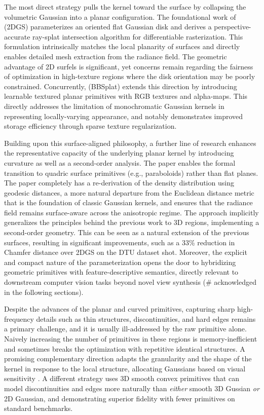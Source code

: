 \documentclass[11pt,a4paper]{article}
\begin{document}
The most direct strategy pulls the kernel toward the surface by collapsing the volumetric Gaussian into a planar configuration. The foundational work of \cite{arxiv:2403.17888v1} (2DGS) parameterizes an oriented flat Gaussian disk and derives a perspective-accurate ray-splat intersection algorithm for differentiable rasterization. This formulation intrinsically matches the local planarity of surfaces and directly enables detailed mesh extraction from the radiance field. The geometric advantage of 2D surfels is significant, yet concerns remain regarding the fairness of optimization in high-texture regions where the disk orientation may be poorly constrained. Concurrently, \cite{arxiv:2411.08508v4} (BBSplat) extends this direction by introducing learnable textured planar primitives with RGB textures and alpha-maps. This directly addresses the limitation of monochromatic Gaussian kernels in representing locally-varying appearance, and notably demonstrates improved storage efficiency through sparse texture regularization.

Building upon this surface-aligned philosophy, a further line of research enhances the representative capacity of the underlying planar kernel by introducing curvature as well as a second-order analysis. The \cite{arxiv:2411.16392v4} paper enables the formal transition to quadric surface primitives (e.g., paraboloids) rather than flat planes. The paper completely has a re-derivation of the density distribution using geodesic distances, a more natural departure from the Euclidean distance metric that is the foundation of classic Gaussian kernels, and ensures that the radiance field remains surface-aware across the anisotropic regime. The approach implicitly generalizes the principles behind the previous work to 3D regions, implementing a second-order geometry. This can be seen as a natural extension of the previous surfaces, resulting in significant improvements, such as a 33\% reduction in Chamfer distance over 2DGS on the DTU dataset shot. Moreover, the explicit and compact nature of the parameterization opens the door to hybridizing geometric primitives with feature-descriptive semantics, directly relevant to downstream computer vision tasks beyond novel view synthesis \cite{arxiv:2508.09977v5} (\# acknowledged in the following sections).

Despite the advances of the planar and curved primitives, capturing sharp high-frequency details such as thin structures, discontinuities, and hard edges remains a primary challenge, and it is usually ill-addressed by the raw primitive alone. Naively increasing the number of primitives in these regions is memory-inefficient and sometimes breaks the optimization with repetitive identical structures. A promising complementary direction adapts the granularity and the shape of the kernel in response to the local structure, allocating Gaussians based on visual sensitivity \cite{arxiv:2506.12400v2}. A different strategy uses 3D smooth convex primitives \cite{arxiv:2411.14974v3} that can model discontinuities and edges more naturally than \emph{either} smooth 3D Gussian \emph{or} 2D Gaussian, and demonstrating superior fidelity with fewer primitives on standard benchmarks.
\end{document}
